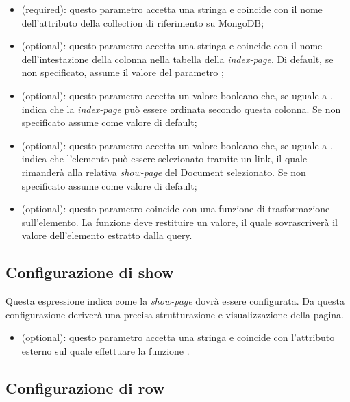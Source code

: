 \begin{itemize}

	\item \textbf{} (required): questo parametro accetta una stringa e coincide con il nome dell'attributo della collection di riferimento su MongoDB;
	\item \textbf{} (optional): questo parametro accetta una stringa e coincide con il nome dell'intestazione della colonna nella tabella della \textit{index-page}. Di default, se non specificato, assume il valore del parametro ;
	\item \textbf{} (optional): questo parametro accetta un valore booleano che, se uguale a , indica che la \textit{index-page} può essere ordinata secondo questa colonna. Se non specificato assume  come valore di default;
	\item \textbf{} (optional): questo parametro accetta un valore booleano che, se uguale a , indica che l'elemento può essere selezionato tramite un link, il quale rimanderà alla relativa \textit{show-page} del Document selezionato. Se non specificato assume  come valore di default;
	\item \textbf{} (optional): questo parametro coincide con una funzione di trasformazione sull'elemento. La funzione deve restituire un valore, il quale sovrascriverà il valore dell'elemento estratto dalla query.
\end{itemize}

\subsection{Configurazione di show}

Questa espressione indica come la \textit{show-page} dovrà essere configurata. Da questa configurazione deriverà una precisa strutturazione e visualizzazione della pagina.

\begin{itemize}

	\item \textbf{} (optional): questo parametro accetta una stringa e coincide con l'attributo esterno sul quale effettuare la funzione .

\end{itemize}

\subsection{Configurazione di row}

